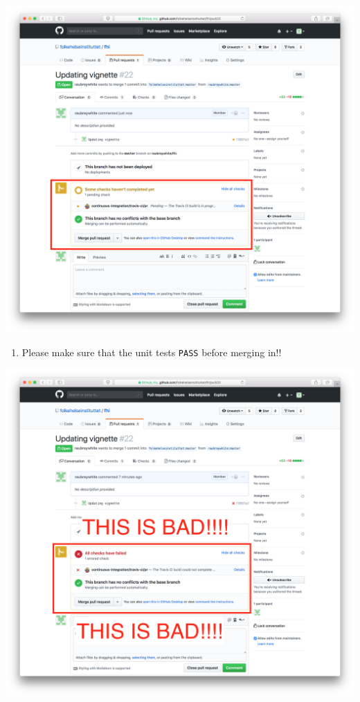 \documentclass[12pt,]{article}
\providecommand{\tightlist}{%
  \setlength{\itemsep}{0pt}\setlength{\parskip}{0pt}}
\begin{document}
\includegraphics{images/pull_request_before_checks.png}

\begin{enumerate}
\def\labelenumi{\arabic{enumi}.}
\setcounter{enumi}{8}
\tightlist
\item
  Please make sure that the unit tests \texttt{PASS} before merging in!!
\end{enumerate}

\includegraphics{images/pull_request_checks_failed.png}
\end{document}
